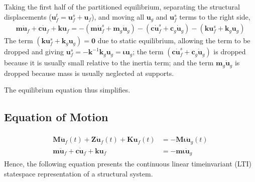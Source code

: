 \documentclass[letterpaper,10pt,english]{sphinxmanual}
\begin{document}
\sphinxAtStartPar
Taking the first half of the partitioned equilibrium, separating the
structural displacements
(\(\mathbf{u}^{t}_{f}=\mathbf{u}^{s}_{f}+\mathbf{u}_{f}\)), and
moving all \(\mathbf{u}_{g}\) and \(\mathbf{u}^{s}_{f}\) terms
to the right side,
\begin{equation*}
\begin{split}\mathbf{m}\mathbf{\ddot{u}}_{f} + \mathbf{c}\mathbf{\dot{u}}_{f} + \mathbf{k}\mathbf{u}_{f}
= -(\mathbf{m}\mathbf{\ddot{u}}^{s}_{f}+\mathbf{m}_{g}\mathbf{\ddot{u}}_{g})
-(\mathbf{c}\mathbf{\dot{u}}^{s}_{f}+\mathbf{c}_{g}\mathbf{\dot{u}}_{g})
-(\mathbf{k}\mathbf{u}^{s}_{f}+\mathbf{k}_{g}\mathbf{u}_{g})\end{split}
\end{equation*}
\sphinxAtStartPar
The term
\((\mathbf{k}\mathbf{u}^{s}_{f}+\mathbf{k}_{g}\mathbf{u}_{g})=\mathbf{0}\)
due to static equilibrium, allowing the term to be dropped and giving
\(\mathbf{u}^{s}_{f} = \mathbf{-k}^{-1}\mathbf{k}_{g}\mathbf{u}_{g} = \mathbf{\iota u}_{g}\);
the term
\((\mathbf{c}\mathbf{\dot{u}}^{s}_{f}+\mathbf{c}_{g}\mathbf{\dot{u}}_{g})\)
is dropped because it is usually small relative to the inertia term; and
the term \(\mathbf{m}_{g}\mathbf{\ddot{u}}_{g}\) is dropped because
mass is usually neglected at supports.

\sphinxAtStartPar
The equilibrium equation thus simplifies.


\subsection{Equation of Motion}
\label{\detokenize{theory/statespace:equation-of-motion}}\begin{equation*}
\begin{split}\begin{aligned}
    \mathbf{M\ddot{u}}_{f}(t) + \mathbf{Z\dot{u}}_{f}(t) + \mathbf{Ku}_{f}(t) &= -\mathbf{M\iota}\mathbf{\ddot{u}}_{g}(t) \\
    \mathbf{m}\mathbf{\ddot{u}}_{f} + \mathbf{c}\mathbf{\dot{u}}_{f} + \mathbf{k}\mathbf{u}_{f}
    &= -\mathbf{m}\mathbf{\iota}\mathbf{\ddot{u}}_{g}
\end{aligned}\end{split}
\end{equation*}
\sphinxAtStartPar
Hence, the following equation presents the continuous linear
time\sphinxhyphen{}invariant (LTI) state\sphinxhyphen{}space representation of a structural system.
\end{document}
